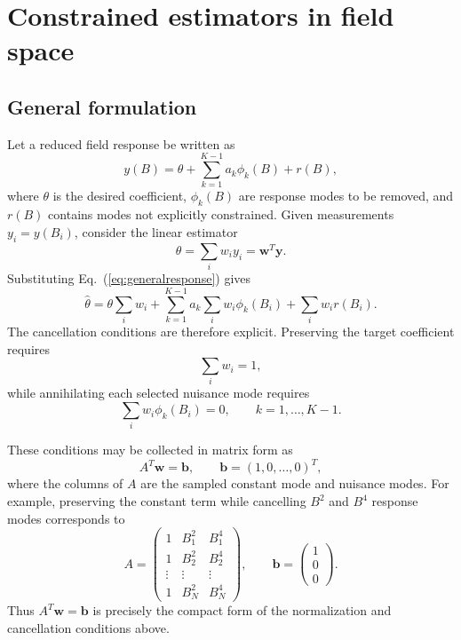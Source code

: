 \documentclass[aps,prd,reprint,twocolumn,superscriptaddress,nofootinbib,longbibliography]{revtex4-2}
\begin{document}
\section{Constrained estimators in field space}
\label{sec:constrained}

\subsection{General formulation}

Let a reduced field response be written as
\begin{equation}
y(B)=\theta+\sum_{k=1}^{K-1}a_k\phi_k(B)+r(B),
\label{eq:generalresponse}
\end{equation}
where $\theta$ is the desired coefficient, $\phi_k(B)$ are response
modes to be removed, and $r(B)$ contains modes not explicitly constrained.
Given measurements $y_i=y(B_i)$, consider the linear estimator
\begin{equation}
\widehat{\theta}
=
\sum_i w_i y_i
=
\bm w^T\bm y.
\label{eq:linear_estimator}
\end{equation}
Substituting Eq.~(\ref{eq:generalresponse}) gives
\begin{equation}
\widehat{\theta}
=
\theta\sum_i w_i
+
\sum_{k=1}^{K-1}a_k\sum_i w_i\phi_k(B_i)
+
\sum_i w_i r(B_i).
\label{eq:constraint_expansion}
\end{equation}
The cancellation conditions are therefore explicit. Preserving the
target coefficient requires
\begin{equation}
\sum_i w_i=1,
\label{eq:preserve_target}
\end{equation}
while annihilating each selected nuisance mode requires
\begin{equation}
\sum_i w_i\phi_k(B_i)=0,
\qquad k=1,\ldots,K-1.
\label{eq:annihilate_modes}
\end{equation}

These conditions may be collected in matrix form as
\begin{equation}
A^T\bm w=\bm b,
\qquad
\bm b=(1,0,\ldots,0)^T,
\label{eq:constraints}
\end{equation}
where the columns of $A$ are the sampled constant mode and nuisance
modes. For example, preserving the constant term while cancelling
$B^2$ and $B^4$ response modes corresponds to
\begin{equation}
A=
\begin{pmatrix}
1 & B_1^2 & B_1^4\\
1 & B_2^2 & B_2^4\\
\vdots & \vdots & \vdots\\
1 & B_N^2 & B_N^4
\end{pmatrix},
\qquad
\bm b=
\begin{pmatrix}
1\\
0\\
0
\end{pmatrix}.
\label{eq:example_design}
\end{equation}
Thus $A^T\bm w=\bm b$ is precisely the compact form of the
normalization and cancellation conditions above.
\end{document}
